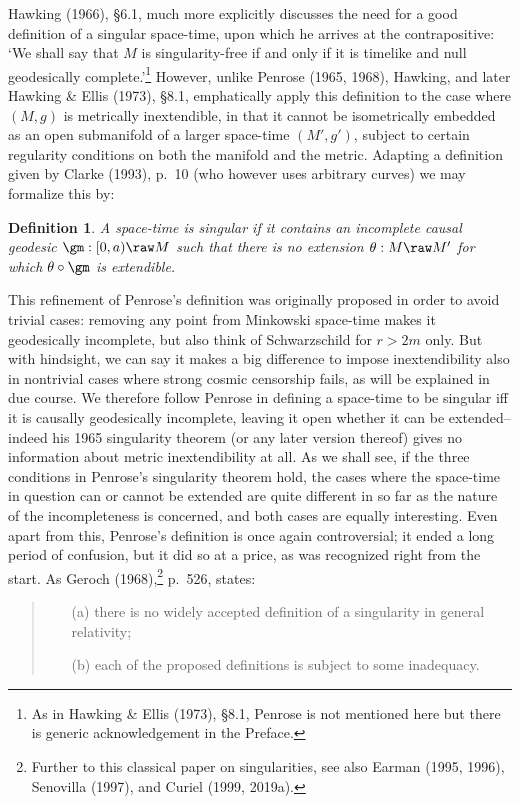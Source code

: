 \documentclass[12pt]{article}
\newtheorem{definition}[theorem]{Definition}
\begin{document}
 Hawking (1966), \S 6.1, much more explicitly discusses the need for a good definition of a singular space-time, upon which he arrives at the contrapositive: `We shall say that $M$ is singularity-free if and only if it is timelike and null geodesically complete.'\footnote{As in Hawking \& Ellis (1973), \S 8.1, Penrose is not mentioned here but there is generic acknowledgement in the Preface.} However, unlike Penrose (1965, 1968), Hawking, and later  Hawking \& Ellis (1973), \S 8.1,
emphatically apply this definition to the case where $(M,g)$ is metrically inextendible, in that it cannot be isometrically embedded as an open submanifold of a larger space-time $(M',g')$, subject to certain regularity conditions on both the manifold and the metric. Adapting a definition given by Clarke (1993), p.\ 10 (who however uses arbitrary curves) we may formalize this by:
\begin{definition}
A space-time is \emph{singular} if it contains an incomplete causal geodesic $\gm:[0,a)\raw M$ such that there is no extension $\theta:M\raw M'$ for which $\theta\circ\gm$ is extendible.
\end{definition}
This refinement of Penrose's  definition was originally proposed in order to avoid trivial cases: removing any point from Minkowski space-time makes it geodesically incomplete, but also think of Schwarzschild for $r>2m$ only. But with hindsight, we can say it makes a big difference to impose inextendibility also in nontrivial cases where strong cosmic censorship fails, as will be explained in due course. 
We therefore follow Penrose in defining a space-time to be singular iff it is causally geodesically incomplete, leaving it open whether it can be extended--indeed his 1965 singularity theorem (or any later version thereof) gives no information about  metric inextendibility at all. 
As we shall see, if the three conditions in Penrose's singularity theorem hold,
 the cases where the space-time in question can or cannot be extended are quite different in so far as the 
  nature of the incompleteness is concerned, and both cases are equally interesting. 
Even apart from this, Penrose's definition is once again  controversial; it ended a long period of confusion, but it did so at a price, as was recognized right from the start. As Geroch (1968),\footnote{Further to this classical paper on singularities,
see also Earman (1995, 1996), Senovilla (1997), and Curiel (1999, 2019a). }
 p.\ 526, states: \begin{quote}
\begin{small}
\begin{enumerate}
\item[(a)] there is no widely accepted definition of a singularity in general relativity;
\item[(b)] each of the proposed definitions is subject to some inadequacy.
\end{enumerate}
\end{small}
\end{quote}
\end{document}
